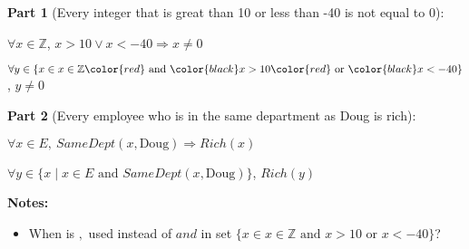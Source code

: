\documentclass[12pt]{article}
\begin{document}
\begin{enumerate}[a.]
\begin{mdframed}
        \bigskip

        \textbf{Part 1} (Every integer that is great than 10 or less than -40 is not equal to 0):

        $\forall x \in \mathbb{Z}$, $x > 10 \lor x < -40 \Rightarrow x \neq 0$

        $\forall y \in \{x \in x \in \mathbb{Z} \color{red}\text{ and }\color{black} x > 10 \color{red}\text{ or }\color{black} x < -40\}$, $y \neq 0$

        \bigskip

        \textbf{Part 2} (Every employee who is in the same department as Doug is rich):

        \bigskip

        $\forall x \in E,\:SameDept(x, \text{Doug}) \Rightarrow Rich(x)$

        $\forall y \in \{x \mid x \in E \text{ and } SameDept(x,\text{Doug})\}$, $Rich(y)$

    \end{mdframed}

    \bigskip

    \textbf{Notes:}

    \begin{itemize}
        \item

        When is $,$ used instead of $and$ in set $\{x \in x \in \mathbb{Z} \text{ and } x > 10 \text{ or } x < -40\}$?
    \end{itemize}

\end{enumerate}
\end{document}
